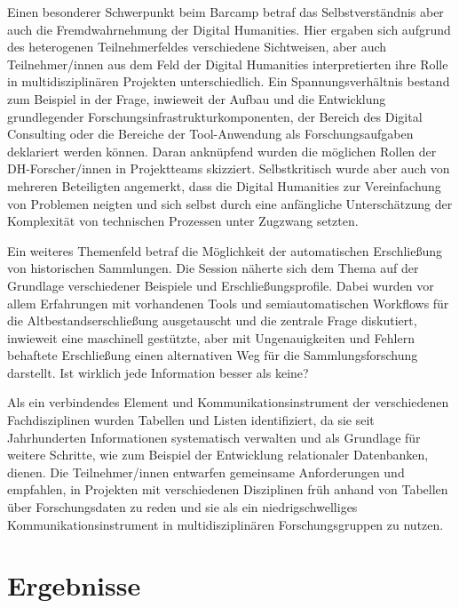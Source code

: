 \documentclass[a4paper,
fontsize=11pt,
oneside,
numbers=noperiodatend,
parskip=half-,
bibliography=totoc,
final
]{scrartcl}
\begin{document}
Einen besonderer Schwerpunkt beim Barcamp betraf das Selbstverständnis
aber auch die Fremdwahrnehmung der Digital Humanities. Hier ergaben sich
aufgrund des heterogenen Teilnehmerfeldes verschiedene Sichtweisen, aber
auch Teilnehmer/innen aus dem Feld der Digital Humanities
interpretierten ihre Rolle in multidisziplinären Projekten
unterschiedlich. Ein Spannungsverhältnis bestand zum Beispiel in der
Frage, inwieweit der Aufbau und die Entwicklung grundlegender
Forschungsinfrastrukturkomponenten, der Bereich des Digital Consulting
oder die Bereiche der Tool-Anwendung als Forschungsaufgaben deklariert
werden können. Daran anknüpfend wurden die möglichen Rollen der
DH-Forscher/innen in Projektteams skizziert. Selbstkritisch wurde aber
auch von mehreren Beteiligten angemerkt, dass die Digital Humanities zur
Vereinfachung von Problemen neigten und sich selbst durch eine
anfängliche Unterschätzung der Komplexität von technischen Prozessen
unter Zugzwang setzten.

Ein weiteres Themenfeld betraf die Möglichkeit der automatischen
Erschließung von historischen Sammlungen. Die Session näherte sich dem
Thema auf der Grundlage verschiedener Beispiele und
Erschließungsprofile. Dabei wurden vor allem Erfahrungen mit vorhandenen
Tools und semiautomatischen Workflows für die Altbestandserschließung
ausgetauscht und die zentrale Frage diskutiert, inwieweit eine
maschinell gestützte, aber mit Ungenauigkeiten und Fehlern behaftete
Erschließung einen alternativen Weg für die Sammlungsforschung
darstellt. Ist wirklich jede Information besser als keine?

Als ein verbindendes Element und Kommunikationsinstrument der
verschiedenen Fachdisziplinen wurden Tabellen und Listen identifiziert,
da sie seit Jahrhunderten Informationen systematisch verwalten und als
Grundlage für weitere Schritte, wie zum Beispiel der Entwicklung
relationaler Datenbanken, dienen. Die Teilnehmer/innen entwarfen
gemeinsame Anforderungen und empfahlen, in Projekten mit verschiedenen
Disziplinen früh anhand von Tabellen über Forschungsdaten zu reden und
sie als ein niedrigschwelliges Kommunikationsinstrument in
multidisziplinären Forschungsgruppen zu nutzen.

\section{Ergebnisse}\label{ergebnisse}
\end{document}
